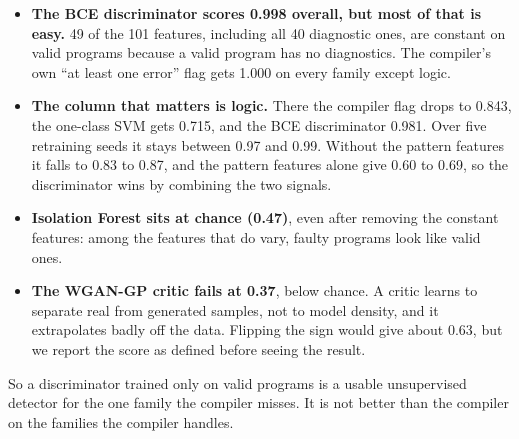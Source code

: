 \begin{itemize}
    \item \textbf{The BCE discriminator scores 0.998 overall, but most of that is easy.} 49 of the 101 features,
    including all 40 diagnostic ones, are constant on valid programs because a valid program has no diagnostics. The
    compiler's own ``at least one error'' flag gets 1.000 on every family except logic.
    \item \textbf{The column that matters is logic.} There the compiler flag drops to 0.843, the one-class SVM gets 0.715,
    and the BCE discriminator 0.981. Over five retraining seeds it stays between 0.97 and 0.99. Without the pattern
    features it falls to 0.83 to 0.87, and the pattern features alone give 0.60 to 0.69, so the discriminator wins by
    combining the two signals.
    \item \textbf{Isolation Forest sits at chance (0.47)}, even after removing the constant features: among the features
    that do vary, faulty programs look like valid ones.
    \item \textbf{The WGAN-GP critic fails at 0.37}, below chance. A critic learns to separate real from generated
    samples, not to model density, and it extrapolates badly off the data. Flipping the sign would give about 0.63, but we
    report the score as defined before seeing the result.
\end{itemize}

So a discriminator trained only on valid programs is a usable unsupervised detector for the one family the compiler
misses. It is not better than the compiler on the families the compiler handles.
